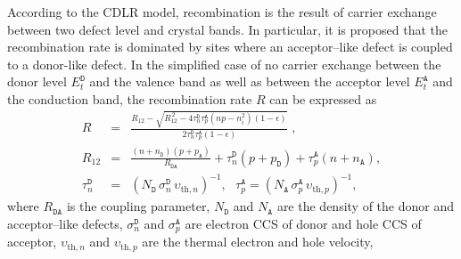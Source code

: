 \documentclass[aip,jap, amsmath,amssymb,reprint]{revtex4-1}
\begin{document}
According to the CDLR model, recombination is the result of carrier exchange between two defect level and crystal bands.
In particular, it is proposed \cite{CDLR:JAP} that the recombination rate is dominated by sites where an acceptor--like defect is coupled to a donor-like defect.
In the simplified case of
no carrier exchange between the donor level $E_t^{\mathtt{D}}$ and the valence band
as well as between the acceptor level $E_t^{\mathtt{A}}$ and the conduction band,
the recombination rate $R$ can be expressed\cite{CDLR:JAP1995} as
\begin{eqnarray}
R&=&\frac{R_{12}-\sqrt{R_{12}^{\,2}-4\tau_{n}^{\mathtt{D}}\tau_{p}^{\mathtt{A}}(np-n_i^2)(1-\epsilon)}}{2\tau_{n}^{\mathtt{D}}\tau_{p}^{\mathtt{A}}(1-\epsilon)}\;,\label{eqR}\\
R_{12}&=&\frac{(n+n_{\mathtt{D}})(p+p_{\mathtt{A}})}{R_{\mathtt{DA}}}+
\tau_{n}^{\mathtt{D}}(p+p_{\mathtt{D}})+\tau_{p}^{\mathtt{A}}(n+n_{\mathtt{A}}),\label{eqR12}\\
\tau_{n}^{\mathtt{D}}&=&(N_{\mathtt{D}}\,\sigma_{n}^{\mathtt{D}}\,\upsilon_{\mathrm{th},n})^{-1},\,\,\,\,
\tau_{p}^{\mathtt{A}}=(N_{\mathtt{A}}\,\sigma_{p}^{\mathtt{A}}\,\upsilon_{\mathrm{th},p})^{-1},\label{eqTAU}
\end{eqnarray}
where
$R_{\mathtt{DA}}$ is the coupling parameter,
$N_{\mathtt{D}}$ and $N_{\mathtt{A}}$ are the density of the donor and acceptor--like defects,
$\sigma_{n}^{\mathtt{D}}$ and $\sigma_{p}^{\mathtt{A}}$ are electron CCS of donor and hole CCS of acceptor,
$\upsilon_{\mathrm{th},n}$ and $\upsilon_{\mathrm{th},p}$ are the thermal electron and hole velocity,
\end{document}
